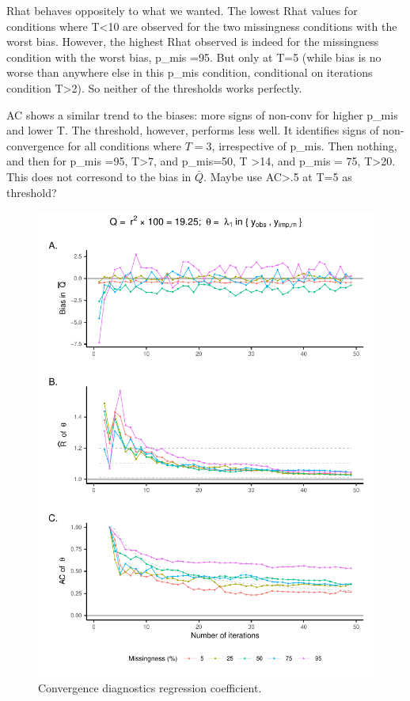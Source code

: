 \documentclass[Royal,times,sageh]{sagej}
\begin{document}
Rhat behaves oppositely to what we wanted. The lowest Rhat values for
conditions where T\textless10 are observed for the two missingness
conditions with the worst bias. However, the highest Rhat observed is
indeed for the missingness condition with the worst bias, p\_mis =95.
But only at T=5 (while bias is no worse than anywhere else in this
p\_mis condition, conditional on iterations condition T\textgreater2).
So neither of the thresholds works perfectly.

AC shows a similar trend to the biases: more signs of non-conv for
higher p\_mis and lower T. The threshold, however, performs less well.
It identifies signs of non-convergence for all conditions where \(T=3\),
irrespective of p\_mis. Then nothing, and then for p\_mis =95,
T\textgreater7, and p\_mis=50, T \textgreater14, and p\_mis = 75,
T\textgreater20. This does not corresond to the bias in \(\bar{Q}\).
Maybe use AC\textgreater.5 at T=5 as threshold?

\begin{figure}

{\centering \includegraphics{manuscript_files/figure-latex/pred-1} 

}

\caption{Convergence diagnostics regression coefficient.}\label{fig:pred}
\end{figure}
\end{document}
